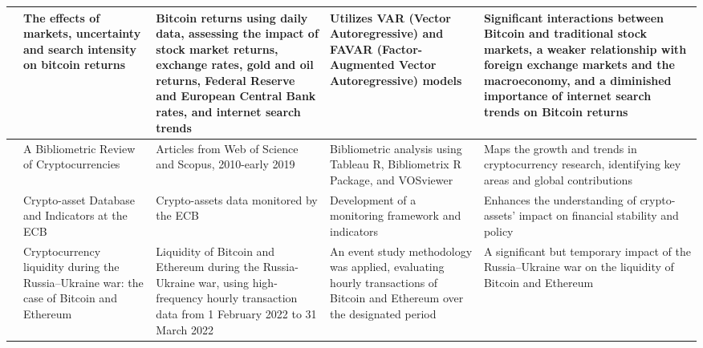 \documentclass{article}
\begin{document}
\begin{longtable}{|p{2.0cm}|p{2cm}|p{2.5cm}|p{3.8cm}|p{5.0cm}|}
\cite{panagiotidis2018effects} & The effects of markets, uncertainty and search intensity on bitcoin returns & Bitcoin returns using daily data, assessing the impact of stock market returns, exchange rates, gold and oil returns, Federal Reserve and European Central Bank rates, and internet search trends & Utilizes VAR (Vector Autoregressive) and FAVAR (Factor-Augmented Vector Autoregressive) models & Significant interactions between Bitcoin and traditional stock markets, a weaker relationship with foreign exchange markets and the macroeconomy, and a diminished importance of internet search trends on Bitcoin returns \\
\hline
\cite{garcia2021bibliometric} & A Bibliometric Review of Cryptocurrencies & Articles from Web of Science and Scopus, 2010-early 2019 & Bibliometric analysis using Tableau R, Bibliometrix R Package, and VOSviewer & Maps the growth and trends in cryptocurrency research, identifying key areas and global contributions \\
\hline
\cite{kerner2021crypto} & Crypto-asset Database and Indicators at the ECB & Crypto-assets data monitored by the ECB & Development of a monitoring framework and indicators & Enhances the understanding of crypto-assets' impact on financial stability and policy \\
\hline
\cite{theiri2022cryptocurrency} & Cryptocurrency liquidity during the Russia–Ukraine war: the case of Bitcoin and Ethereum & Liquidity of Bitcoin and Ethereum during the Russia-Ukraine war, using high-frequency hourly transaction data from 1 February 2022 to 31 March 2022 & An event study methodology was applied, evaluating hourly transactions of Bitcoin and Ethereum over the designated period & A significant but temporary impact of the Russia–Ukraine war on the liquidity of Bitcoin and Ethereum \\
\hline


\end{longtable}
\end{document}
